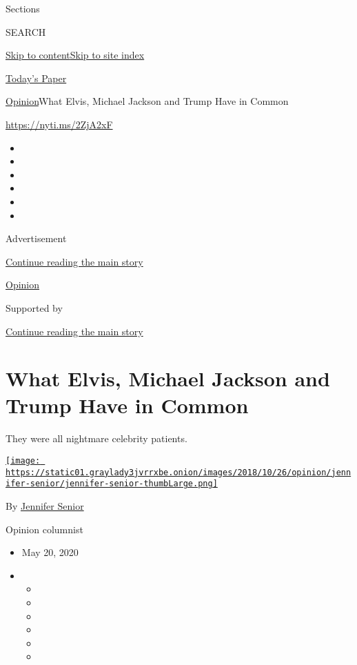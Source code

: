 Sections

SEARCH

\protect\hyperlink{site-content}{Skip to
content}\protect\hyperlink{site-index}{Skip to site index}

\href{https://myaccount.nytimes3xbfgragh.onion/auth/login?response_type=cookie\&client_id=vi}{}

\href{https://www.nytimes3xbfgragh.onion/section/todayspaper}{Today's
Paper}

\href{/section/opinion}{Opinion}\textbar{}What Elvis, Michael Jackson
and Trump Have in Common

\url{https://nyti.ms/2ZjA2xF}

\begin{itemize}
\item
\item
\item
\item
\item
\item
\end{itemize}

Advertisement

\protect\hyperlink{after-top}{Continue reading the main story}

\href{/section/opinion}{Opinion}

Supported by

\protect\hyperlink{after-sponsor}{Continue reading the main story}

\hypertarget{what-elvis-michael-jackson-and-trump-have-in-common}{%
\section{What Elvis, Michael Jackson and Trump Have in
Common}\label{what-elvis-michael-jackson-and-trump-have-in-common}}

They were all nightmare celebrity patients.

\href{https://www.nytimes3xbfgragh.onion/by/jennifer-senior}{\texttt{[image: https://static01.graylady3jvrrxbe.onion/images/2018/10/26/opinion/jennifer-senior/jennifer-senior-thumbLarge.png]}}

By \href{https://www.nytimes3xbfgragh.onion/by/jennifer-senior}{Jennifer
Senior}

Opinion columnist

\begin{itemize}
\item
  May 20, 2020
\item
  \begin{itemize}
  \item
  \item
  \item
  \item
  \item
  \item
  \end{itemize}
\end{itemize}


